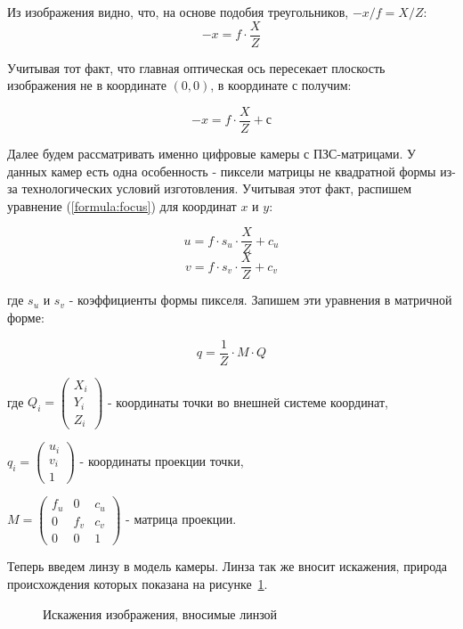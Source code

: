 Из изображения видно, что, на основе подобия треугольников, $-x/f = X/Z$:
$$	-x = f \cdot \frac{X}{Z} $$

Учитывая тот факт, что главная оптическая ось пересекает плоскость изображения не в координате $(0,0)$, в координате $с$ получим:

\begin{equation}
\label{formula:focus}
-x = f \cdot \frac{X}{Z} + с
\end{equation}

Далее будем рассматривать именно цифровые камеры с ПЗС-матрицами. У данных камер есть одна особенность - пиксели матрицы не квадратной формы из-за технологических условий изготовления. Учитывая этот факт, распишем уравнение (\ref{formula:focus}) для координат $x$ и $y$:

$$ u = f \cdot s_u \cdot \frac{X}{Z} + c_u $$
$$ v = f \cdot s_v \cdot \frac{X}{Z} + c_v $$

где $s_u$ и $s_v$ - коэффициенты формы пикселя.
Запишем эти уравнения в матричной форме:

\begin{equation}
\label{formula:matrixProection}
q = \frac{1}{Z} \cdot M \cdot Q
\end{equation}

где 
$Q_i = 
\left( 
\begin{array}{c}
X_i \\ 
Y_i \\ 
Z_i
\end{array} 
\right)$ - координаты точки во внешней системе координат,

$q_i = 
\left( 
\begin{array}{c}
u_i \\ 
v_i \\ 
1
\end{array} 
\right)$ - координаты проекции точки,

$M = 
\left( 
\begin{array}{ccc}
f_u & 0 & c_u \\ 
0 & f_v & c_v \\ 
0 & 0 & 1
\end{array} 
\right)$ - матрица проекции.

Теперь введем линзу в модель камеры. Линза так же вносит искажения, природа происхождения которых показана на рисунке~\ref{pic:distorb}.

\begin{figure}[!htb]
\caption{Искажения изображения, вносимые линзой}
\label{pic:distorb}
\end{figure}

